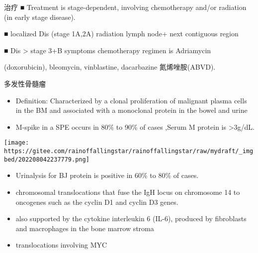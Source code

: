 \documentclass[
  ignorenonframetext,
]{beamer}
\providecommand{\tightlist}{%
  \setlength{\itemsep}{0pt}\setlength{\parskip}{0pt}}
\begin{document}
\begin{frame}
\begin{block}{治疗}
\protect\hypertarget{ux6cbbux7597-11}{}
■ Treatment is stage-dependent, involving chemotherapy and/or radiation
(in early stage disease).

■ localized Dis (stage 1A,2A) radiation lymph node+ next contiguous
region

■ Dis \textgreater{} stage 3+B symptoms chemotherapy regimen is
Adriamycin

(doxorubicin), bleomycin, vinblastine, dacarbazine 氮烯唑胺(ABVD).
\end{block}
\end{frame}

\begin{frame}
\begin{block}{多发性骨髓瘤}
\protect\hypertarget{ux591aux53d1ux6027ux9aa8ux9ad3ux7624}{}
\begin{itemize}
\item
  Definition: Characterized by a clonal proliferation of malignant
  plasma cells in the BM and associated with a monoclonal protein in the
  bowel and urine
\item
  M-spike in a SPE occurs in 80\% to 90\% of cases ,Serum M protein is
  \textgreater3g/dL.
\end{itemize}

\texttt{[image: https://gitee.com/rainoffallingstar/rainoffallingstar/raw/mydraft/\_imgbed/202208042237779.png]}

\begin{itemize}
\tightlist
\item
  Urinalysis for BJ protein is positive in 60\% to 80\% of cases.
\end{itemize}
\end{block}
\end{frame}

\begin{frame}
\begin{itemize}
\item
  chromosomal translocations that fuse the IgH locus on chromosome 14 to
  oncogenes such as the cyclin D1 and cyclin D3 genes.
\item
  also supported by the cytokine interleukin 6 (IL-6), produced by
  fibroblasts and macrophages in the bone marrow stroma
\item
  translocations involving MYC
\end{itemize}
\end{frame}
\end{document}

